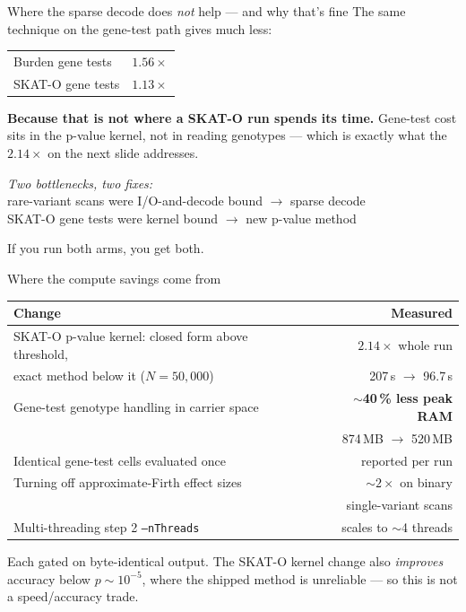 \documentclass[aspectratio=169,11pt]{beamer}
\newcommand{\win}[1]{\textcolor{good}{\textbf{#1}}}
\begin{document}
\begin{frame}{Where the sparse decode does \emph{not} help --- and why that's fine}
The same technique on the gene-test path gives much less:

\medskip
\begin{center}
\begin{tabular}{lr}
\toprule
Burden gene tests & $1.56\times$ \\
SKAT-O gene tests & $1.13\times$ \\
\bottomrule
\end{tabular}
\end{center}

\medskip
\textbf{Because that is not where a SKAT-O run spends its time.} Gene-test cost
sits in the p-value kernel, not in reading genotypes --- which is exactly what
the \win{$2.14\times$} on the next slide addresses.

\medskip
\begin{center}
\emph{Two bottlenecks, two fixes:} \\[0.4em]
rare-variant scans were I/O-and-decode bound $\rightarrow$ sparse decode \\
SKAT-O gene tests were kernel bound $\rightarrow$ new p-value method
\end{center}

\medskip
If you run both arms, you get both.
\end{frame}

\begin{frame}{Where the compute savings come from}
\begin{center}
\begin{tabular}{lr}
\toprule
Change & Measured \\
\midrule
SKAT-O p-value kernel: closed form above threshold, & \win{$2.14\times$} whole run \\
\quad exact method below it {\footnotesize ($N=50{,}000$)} & {\footnotesize 207\,s $\to$ 96.7\,s} \\
\addlinespace
Gene-test genotype handling in carrier space & \win{$\sim$40\,\% less peak RAM} \\
 & {\footnotesize 874\,MB $\to$ 520\,MB} \\
\addlinespace
Identical gene-test cells evaluated once & reported per run \\
\addlinespace
Turning off approximate-Firth effect sizes & \win{$\sim2\times$} on binary \\
 & \quad single-variant scans \\
\addlinespace
Multi-threading step 2 \texttt{--nThreads} & scales to $\sim$4 threads \\
\bottomrule
\end{tabular}
\end{center}

\medskip
{\footnotesize Each gated on byte-identical output. The SKAT-O kernel change also
\emph{improves} accuracy below $p\sim10^{-5}$, where the shipped method is
unreliable --- so this is not a speed/accuracy trade.}
\end{frame}
\end{document}

